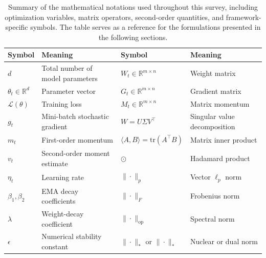 \begin{table}[!t]
  \centering
  \caption{Summary of the mathematical notations used throughout this survey, including optimization variables, matrix operators, second-order quantities, and framework-specific symbols. The table serves as a reference for the formulations presented in the following sections.}
  \label{tab:notation}
  \footnotesize
  \setlength{\tabcolsep}{2pt}
  \begin{tabularx}{\textwidth}{@{}>{\raggedright\arraybackslash}p{}>{\raggedright\arraybackslash}X|>{\raggedright\arraybackslash}p{}>{\raggedright\arraybackslash}X@{}}
    \toprule
    \textbf{Symbol} & \textbf{Meaning} &
    \textbf{Symbol} & \textbf{Meaning} \\
    \midrule

    $d$ & Total number of model parameters &
    $W_t\in\mathbb{R}^{m\times n}$ & Weight matrix \\

    $\theta_t\in\mathbb{R}^{d}$ & Parameter vector &
    $G_t\in\mathbb{R}^{m\times n}$ & Gradient matrix \\

    $\mathcal{L}(\theta)$ & Training loss &
    $M_t\in\mathbb{R}^{m\times n}$ & Matrix momentum \\

    $g_t$ & Mini-batch stochastic gradient &
    $W=U\Sigma V^\top$ & Singular value decomposition \\

    $m_t$ & First-order momentum &
    $\langle A,B\rangle=\mathrm{tr}(A^\top B)$ & Matrix inner product \\

    $v_t$ & Second-order moment estimate &
    $\odot$ & Hadamard product \\

    $\eta_t$ & Learning rate &
    $\|\cdot\|_p$ & Vector $\ell_p$ norm \\

    $\beta_1,\beta_2$ & EMA decay coefficients &
    $\|\cdot\|_F$ & Frobenius norm \\

    $\lambda$ & Weight-decay coefficient &
    $\|\cdot\|_{\mathrm{op}}$ & Spectral norm \\

    $\epsilon$ & Numerical stability constant &
    $\|\cdot\|_\ast$ or $\|\cdot\|_*$ & Nuclear or dual norm \\


\end{tabularx}
\end{table}
